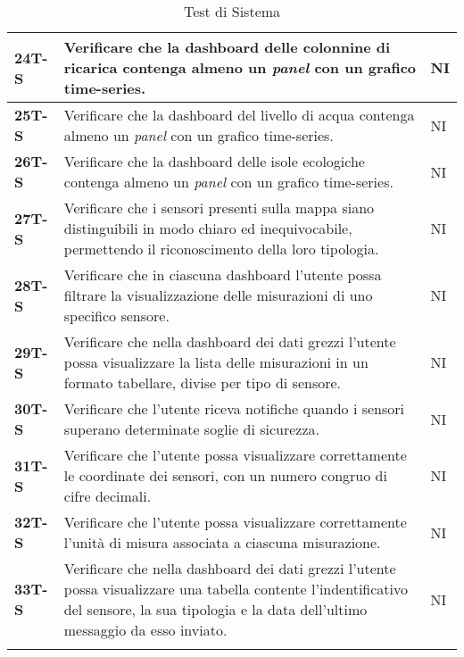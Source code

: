 \begin{longtable}{|>{\raggedright\arraybackslash}m{}|>{\raggedright\arraybackslash}m{}|>{\raggedright\arraybackslash}m{}|}
	\hline
	\textbf{24T-S}  & Verificare che la dashboard delle colonnine di ricarica contenga almeno un \textit{panel} con un grafico time-series.                                                                            & NI             \\
	\hline
	\textbf{25T-S}  & Verificare che la dashboard del livello di acqua contenga almeno un \textit{panel} con un grafico time-series.                                                                                   & NI             \\
	\hline
	\textbf{26T-S}  & Verificare che la dashboard delle isole ecologiche contenga almeno un \textit{panel} con un grafico time-series.                                                                                 & NI             \\
	\hline
	\textbf{27T-S}  & Verificare che i sensori presenti sulla mappa siano distinguibili in modo chiaro ed inequivocabile, permettendo il riconoscimento della loro tipologia.                                          & NI             \\
	\hline
	\textbf{28T-S}  & Verificare che in ciascuna dashboard l’utente possa filtrare la visualizzazione delle misurazioni di uno specifico sensore.                                                                      & NI             \\
	\hline
	\textbf{29T-S}  & Verificare che nella dashboard dei dati grezzi l’utente possa visualizzare la lista delle misurazioni in un formato tabellare, divise per tipo di sensore.                                       & NI             \\ %
	\hline
	\textbf{30T-S}  & Verificare che l’utente riceva notifiche quando i sensori superano determinate soglie di sicurezza.                                                                                          & NI             \\
	\hline
	\textbf{31T-S}  & Verificare che l’utente possa visualizzare correttamente le coordinate dei sensori, con un numero congruo di cifre decimali.                                                                     & NI             \\
	\hline
	\textbf{32T-S}  & Verificare che l’utente possa visualizzare correttamente l’unità di misura associata a ciascuna misurazione.                                                                                     & NI             \\
	\hline
	\textbf{33T-S}  & Verificare che nella dashboard dei dati grezzi l'utente possa visualizzare una tabella contente l'indentificativo del sensore, la sua tipologia e la data dell'ultimo messaggio da esso inviato. & NI             \\
	\hline
	\caption{Test di Sistema}
\end{longtable}

